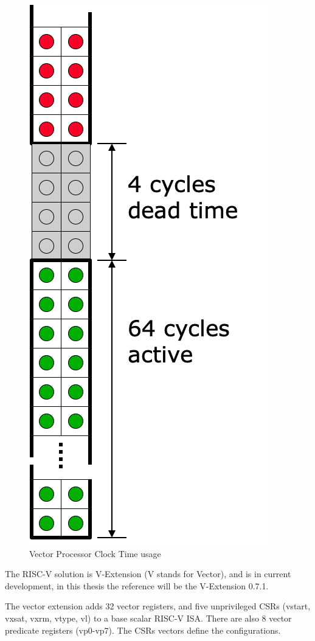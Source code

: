 \begin{figure}[H]
    \centering
    \includegraphics[scale = 0.4]{Chapter_1/img/vectoring_2.png}
    \caption{Vector Processor Clock Time usage \cite{L15-Krste}}
    \label{Vectoring}
\end{figure}
The RISC-V solution is V-Extension (V stands for Vector), and is in current development, in this thesis the reference will be the V-Extension 0.7.1.

The vector extension adds 32 vector registers, and five unprivileged CSRs (vstart, vxsat, vxrm, vtype, vl) to a base scalar RISC-V ISA\cite{riscv-v-specs}.
There are also 8 vector predicate registers (vp0-vp7). The CSRs vectors define the configurations.

